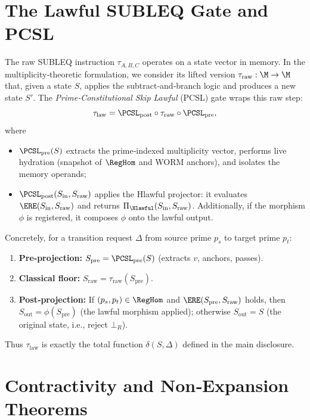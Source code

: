 \documentclass[11pt,a4paper]{article}
\theoremstyle{definition}
\theoremstyle{remark}
\begin{document}
\section{The Lawful SUBLEQ Gate and PCSL}
\label{sec:pcsl}
The raw SUBLEQ instruction $\tau_{A,B,C}$ operates on a state vector in memory. In the multiplicity‑theoretic formulation, we consider its lifted version $\tau_{\text{raw}} : \M \to \M$ that, given a state $S$, applies the subtract‑and‑branch logic and produces a new state $S'$. The \emph{Prime‑Constitutional Skip Lawful} (PCSL) gate wraps this raw step:
\[
\tau_{\text{law}} = \PCSL_{\text{post}} \circ \tau_{\text{raw}} \circ \PCSL_{\text{pre}},
\]
where
\begin{itemize}[noitemsep]
\item $\PCSL_{\text{pre}}(S)$ extracts the prime‑indexed multiplicity vector, performs live hydration (snapshot of $\RegHom$ and WORM anchors), and isolates the memory operands;
\item $\PCSL_{\text{post}}(S_{\text{in}}, S_{\text{raw}})$ applies the Hlawful projector: it evaluates $\ERE(S_{\text{in}}, S_{\text{raw}})$ and returns $\Pi_{\Hlawful}(S_{\text{in}}, S_{\text{raw}})$. Additionally, if the morphism $\phi$ is registered, it composes $\phi$ onto the lawful output.
\end{itemize}
Concretely, for a transition request $\Delta$ from source prime $p_s$ to target prime $p_t$:
\begin{enumerate}[noitemsep]
\item \textbf{Pre‑projection:} $S_{\text{pre}} = \PCSL_{\text{pre}}(S)$ (extracts $v$, anchors, passes).
\item \textbf{Classical floor:} $S_{\text{raw}} = \tau_{\text{raw}}(S_{\text{pre}})$.
\item \textbf{Post‑projection:} If $(p_s, p_t) \in \RegHom$ and $\ERE(S_{\text{pre}}, S_{\text{raw}})$ holds, then $S_{\text{out}} = \phi(S_{\text{pre}})$ (the lawful morphism applied); otherwise $S_{\text{out}} = S$ (the original state, i.e., reject $\bot_R$).
\end{enumerate}
Thus $\tau_{\text{law}}$ is exactly the total function $\delta(S,\Delta)$ defined in the main disclosure.

\section{Contractivity and Non‑Expansion Theorems}
\label{sec:mainthms}
\end{document}
